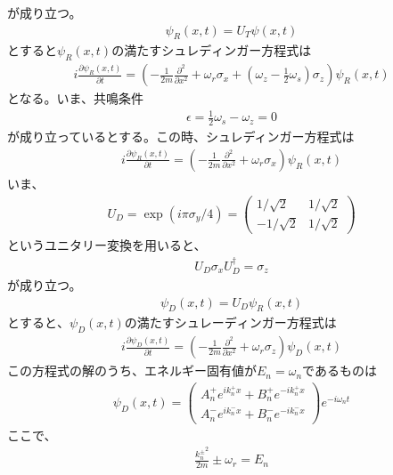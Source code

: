 が成り立つ。
\begin{align}
{\psi}_{R}(x,t)=U_{T}{\psi}(x,t)
\end{align}
$とすると{\psi}_{R}(x,t)の満たすシュレディンガー方程式は$
\begin{align}
i\frac{\partial {\psi}_{R}(x,t)}{\partial t}=\left(-\frac{1}{2m}\frac{\partial^2}{\partial x^2}+\omega_{r}{\sigma}_{x}+\left(\omega_{z}-\frac{1}{2}\omega_{s}\right){\sigma}_{z}\right){\psi}_{R}(x,t)
\end{align}
となる。いま、共鳴条件
\begin{align}
{\epsilon}=\frac{1}{2}\omega_{s}-\omega_{z}=0\label{pi2flipper_resonance}
\end{align}
が成り立っているとする。この時、シュレディンガー方程式は
\begin{align}
i\frac{\partial {\psi}_{R}(x,t)}{\partial t}=\left(-\frac{1}{2m}\frac{\partial^2}{\partial x^2}+\omega_{r}{\sigma}_{x}\right){\psi}_{R}(x,t)
\end{align}
いま、
\begin{align}
U_{D}=\exp(i{\pi}{\sigma}_{y}/4)=
\begin{pmatrix}
1/\sqrt{2} &1/\sqrt{2} \\
-1/\sqrt{2} &1/\sqrt{2}
\end{pmatrix}
\end{align}
というユニタリー変換を用いると、
\begin{align}
U_{D}{\sigma}_{x}U_{D}^{\dagger}={\sigma}_{z}
\end{align}
が成り立つ。
\begin{align}
{\psi}_{D}(x,t)=U_{D}{\psi}_{R}(x,t)
\end{align}
$とすると、{\psi}_{D}(x,t)の満たすシュレーディンガー方程式は$
\begin{align}
i\frac{\partial {\psi}_{D}(x,t)}{\partial t}=\left(-\frac{1}{2m}\frac{\partial^2}{\partial x^2}+\omega_{r}{\sigma}_{z}\right){\psi}_{D}(x,t)
\end{align}
$この方程式の解のうち、エネルギー固有値がE_{n}=\omega_{n}であるものは$
\begin{align}
{\psi}_{D}(x,t) =
\begin{pmatrix}
A_{n}^{+}e^{ik_{n}^{+}x}+B_{n}^{+}e^{-ik_{n}^{+}x}  \\
A_{n}^{-}e^{ik_{n}^{-}x}+B_{n}^{-}e^{-ik_{n}^{-}x}
\end{pmatrix}
e^{-i\omega_{n}t}
\end{align}
ここで、
\begin{align}
\frac{{k_{n}^{\pm}}^2}{2m}{\pm}\omega_{r}=E_{n}
\end{align}
